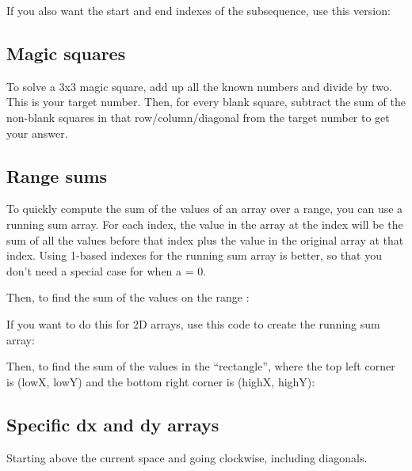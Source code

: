 If you also want the start and end indexes of the subsequence, use this version:



\subsection*{Magic squares}

To solve a 3x3 magic square, add up all the known numbers and divide by two. This is your target number. Then, for every blank square, subtract the sum of the non-blank squares in that row/column/diagonal from the target number to get your answer.

\subsection*{Range sums}

To quickly compute the sum of the values of an array over a range, you can use a running sum array. For each index, the value in the array at the index will be the sum of all the values before that index plus the value in the original array at that index. Using 1-based indexes for the running sum array is better, so that you don’t need a special case for when a = 0.



Then, to find the sum of the values on the range \inline{[a, b]}:



If you want to do this for 2D arrays, use this code to create the running sum array:



Then, to find the sum of the values in the “rectangle”, where the top left corner is (lowX, lowY) and the bottom right corner is (highX, highY):



\subsection*{Specific dx and dy arrays}

Starting above the current space and going clockwise, including diagonals.



